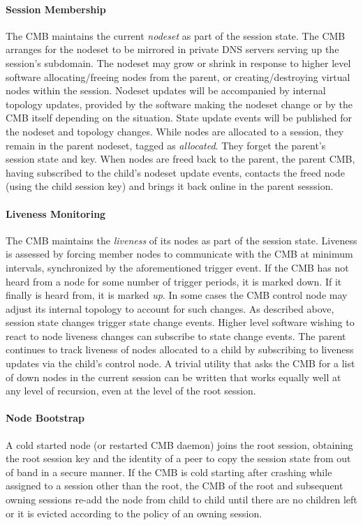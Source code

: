 \paragraph{Session Membership}
The CMB maintains the current {\em nodeset} as part of the session state.
The CMB arranges for the nodeset to be mirrored in private DNS servers
serving up the session's subdomain.
The nodeset may grow or shrink in response to higher level software
allocating/freeing nodes from the parent, or creating/destroying 
virtual nodes within the session.
Nodeset updates will be accompanied by internal topology updates, provided by
the software making the nodeset change or by the CMB itself depending
on the situation.
State update events will be published for the nodeset and topology changes.
While nodes are allocated to a session, they remain in the parent nodeset,
tagged as {\em allocated}.  They forget the parent's session state and key.
When nodes are freed back to the parent, the parent CMB, having subscribed
to the child's nodeset update events, contacts the freed node (using the
child session key) and brings it back online in the parent sesssion.  

\paragraph{Liveness Monitoring}
The CMB maintains the {\em liveness} of its nodes as part
of the session state.
Liveness is assessed by forcing member nodes to communicate with the CMB
at minimum intervals, synchronized by the aforementioned trigger event.
If the CMB has not heard from a node for some number
of trigger periods, it is marked down.
If it finally is heard from, it is marked {\em up}.
In some cases the CMB control node may adjust its internal topology
to account for such changes.
As described above, session state changes trigger state change events.
Higher level software wishing to react to node liveness changes can
subscribe to state change events.
The parent continues to track liveness of nodes allocated to a child by
subscribing to liveness updates via the child's control node.  A trivial
utility that asks the CMB for a list of down nodes in the current session
can be written that works equally well at any level of recursion,
even at the level of the root session.

\paragraph{Node Bootstrap}
A cold started node (or restarted CMB daemon) joins the root session,
obtaining the root session key and the identity of a peer to copy the
session state from out of band in a secure manner.
If the CMB is cold starting after crashing while assigned to
a session other than the root, the CMB of the root and subsequent owning
sessions re-add the node from child to child until there are no children
left or it is evicted according to the policy of an owning session.

